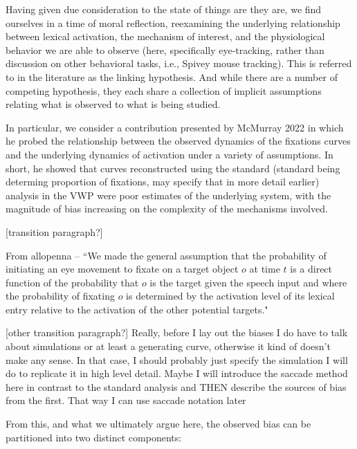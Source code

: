 \documentclass{article}
\begin{document}
Having given due consideration to the state of things are they are, we find ourselves in a time of moral reflection, reexamining the underlying relationship between lexical activation, the mechanism of interest, and the physiological behavior we are able to observe (here, specifically eye-tracking, rather than discussion on other behavioral tasks, i.e., Spivey mouse tracking). This is referred to in the literature as the linking hypothesis. And while there are a number of competing hypothesis, they each share a collection of implicit assumptions relating what is observed to what is being studied.

In particular, we consider a contribution presented by McMurray 2022 in which he probed the relationship between the observed dynamics of the fixations curves and the underlying dynamics of activation under a variety of assumptions. In short, he showed that curves reconstructed using the standard  (standard being determing proportion of fixations, may specify that in more detail earlier) analysis in the VWP were poor estimates of the underlying system, with the magnitude of bias increasing on the complexity of the mechanisms involved.

[transition paragraph?]

From allopenna -- ``We made the general assumption that the probability of initiating an eye movement to fixate on a target object $o$ at time $t$ is a direct function of the probability that $o$ is the target given the speech input and where the probability of fixating $o$ is determined by the activation level of its lexical entry relative to the activation of the other potential targets."

[other transition paragraph?] Really, before I lay out the biases I do have to talk about simulations or at least a generating curve, otherwise it kind of doesn't make any sense. In that case, I should probably just specify the simulation I will do to replicate it in high level detail. Maybe I will introduce the saccade method here in contrast to the standard analysis and THEN describe the sources of bias from the first. That way I can use saccade notation later

From this, and what we ultimately argue here, the observed bias can be partitioned into two distinct components:
\end{document}
